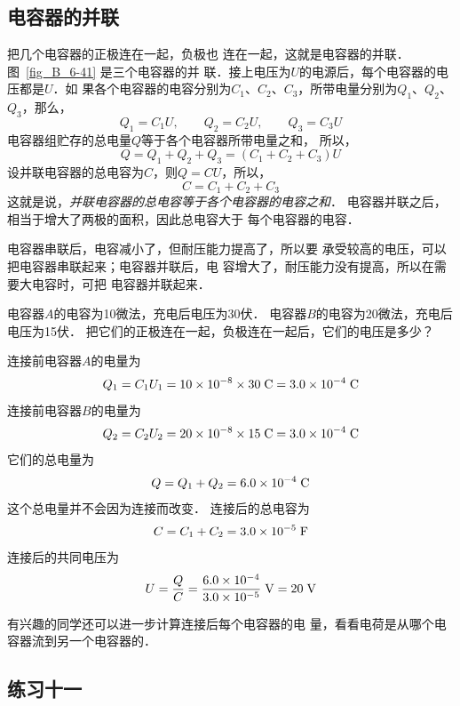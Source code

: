 \subsection{电容器的并联} 


把几个电容器的正极连在一起，负极也
连在一起，这就是电容器的并联．图~\ref{fig_B_6-41} 是三个电容器的并
联．接上电压为$U$的电源后，每个电容器的电压都是$U$．如
果各个电容器的电容分别为$C_1$、$C_2$、$C_3$，所带电量分别为$Q_1$、$Q_2$、$Q_3$，那么，
\[Q_1=C_1U,\qquad Q_2=C_2U,\qquad Q_3=C_3U\]
电容器组贮存的总电量$Q$等于各个电容器所带电量之和，
所以，
\[Q=Q_1+Q_2+Q_3=(C_1+C_2+C_3)U\]
设并联电容器的总电容为$C$，则$Q=CU$，所以，
\[C=C_1+C_2+C_3\]
这就是说，\textit{并联电容器的总电容等于各个电容器的电容之和}．
电容器并联之后，相当于增大了两极的面积，因此总电容大于
每个电容器的电容．

电容器串联后，电容减小了，但耐压能力提高了，所以要
承受较高的电压，可以把电容器串联起来；电容器并联后，电
容增大了，耐压能力没有提高，所以在需要大电容时，可把
电容器并联起来．

\begin{example}
电容器$A$的电容为10微法，充电后电压为30伏．
电容器$B$的电容为20微法，充电后电压为15伏．
把它们的正极连在一起，负极连在一起后，它们的电压是多少？
\end{example}


\begin{solution}
连接前电容器$A$的电量为
\[Q_1=C_1U_1=10\times10^{-8}\times30 \;\text{C} =3.0\times10^{-4} \;\text{C} \]
连接前电容器$B$的电量为
\[Q_2=C_2U_2=20\times10^{-8}\times 15 \;\text{C} =3.0\times10^{-4} \;\text{C} \]
它们的总电量为
\[Q=Q_1+Q_2=6.0\times10^{-4} \;\text{C} \]
这个总电量并不会因为连接而改变．
连接后的总电容为
\[C=C_1+C_2=3.0\times10^{-5} \;\text{F} \]
连接后的共同电压为
\[U=\frac{Q}{C}=\frac{6.0\times10^{-4}}{3.0\times10^{-5}} \;\text{V} =20 \;\text{V} \]
\end{solution}

有兴趣的同学还可以进一步计算连接后每个电容器的电
量，看看电荷是从哪个电容器流到另一个电容器的．

\subsection*{练习十一}

